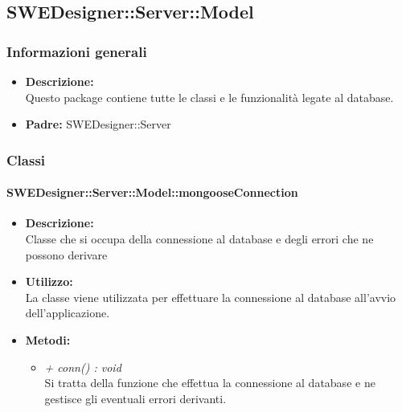   \subsection{SWEDesigner::Server::Model}
    \subsubsection{Informazioni generali}
      \begin{itemize}
        \item \textbf{Descrizione:}\\
        Questo package contiene tutte le classi e le funzionalità legate al database.
        \item \textbf{Padre: }SWEDesigner::Server
      \end{itemize}
    \subsubsection{Classi}
      \paragraph{SWEDesigner::Server::Model::mongooseConnection}
        \begin{itemize}
          \item \textbf{Descrizione: }\\
          Classe che si occupa della connessione al database e degli errori che ne possono derivare
          \item \textbf{Utilizzo: }\\
          La classe viene utilizzata per effettuare la connessione al database all'avvio dell'applicazione.
          \item \textbf{Metodi: }\\
          \begin{itemize}
            \item \emph{+ conn() : void}\\
            Si tratta della funzione che effettua la connessione al database e ne gestisce gli eventuali errori derivanti.
          \end{itemize}
        \end{itemize}
